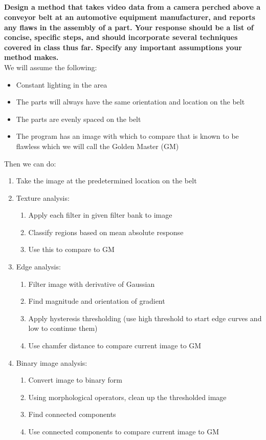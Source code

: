 \documentclass[11pt]{amsart}
\begin{document}
\subsection{}
\textbf{Design a method that takes video data from a camera perched above a conveyor belt at an automotive equipment manufacturer, and reports any flaws in the assembly of a part. Your response should be a list of concise, specific steps, and should incorporate several techniques covered in class thus far. Specify any important assumptions your method makes.} \\
\vspace{5mm}
We will assume the following:
\begin{itemize}
\item Constant lighting in the area
\item The parts will always have the same orientation and location on the belt
\item The parts are evenly spaced on the belt
\item The program has an image with which to compare that is known to be flawless which we will call the Golden Master (GM)
\end{itemize}

Then we can do:
\begin{enumerate}
\item Take the image at the predetermined location on the belt
\item Texture analysis:
	\begin{enumerate}
	\item Apply each filter in given filter bank to image
	\item Classify regions based on mean absolute response
	\item Use this to compare to GM
	\end{enumerate}
\item Edge analysis:
	\begin{enumerate}
	\item Filter image with derivative of Gaussian
	\item Find magnitude and orientation of gradient
	\item Apply hysteresis thresholding (use high threshold to start edge curves and low to continue them)
	\item Use chamfer distance to compare current image to GM
	\end{enumerate}
\item Binary image analysis:
	\begin{enumerate}
	\item Convert image to binary form
	\item Using morphological operators, clean up the thresholded image
	\item Find connected components
	\item Use connected components to compare current image to GM
	\end{enumerate}
\end{enumerate}
\end{document}
